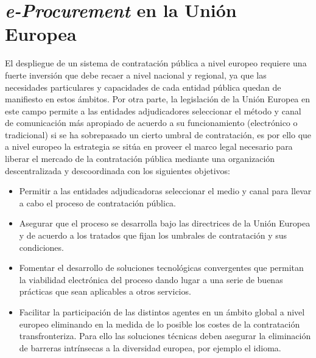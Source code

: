 \section{\textit{e-Procurement} en la Unión Europea}\label{e-proc-eu}
El despliegue de un sistema de contratación pública a nivel europeo requiere
una fuerte inversión que debe recaer a nivel nacional y regional, ya que las necesidades
particulares y capacidades de cada entidad pública quedan de manifiesto en estos ámbitos.
Por otra parte, la legislación de la Unión \gls{Europea} en este campo permite a las entidades
adjudicadores seleccionar el método y canal de comunicación más apropiado de acuerdo
a su funcionamiento (electrónico o tradicional) si se ha sobrepasado un cierto umbral
de contratación, es por ello que a nivel europeo la estrategia se sitúa en proveer
el marco legal necesario para liberar el mercado de la contratación pública mediante
una organización descentralizada y descoordinada con los siguientes objetivos:
\begin{itemize}
 \item Permitir a las entidades adjudicadoras seleccionar el medio y canal para llevar
a cabo el proceso de contratación pública.
\item Asegurar que el proceso se desarrolla bajo las directrices de la Unión Europea
y de acuerdo a los tratados que fijan los umbrales de contratación y sus condiciones.
\item Fomentar el desarrollo de soluciones tecnológicas convergentes que permitan
la viabilidad electrónica del proceso dando lugar a una serie de buenas prácticas
que sean aplicables a otros servicios.
\item Facilitar la participación de las distintos agentes en un ámbito global a nivel
europeo eliminando en la medida de lo posible los costes de la contratación transfronteriza. Para ello
las soluciones técnicas deben asegurar la eliminación de barreras intrínsecas a la diversidad
europea, por ejemplo el idioma.
\end{itemize}

